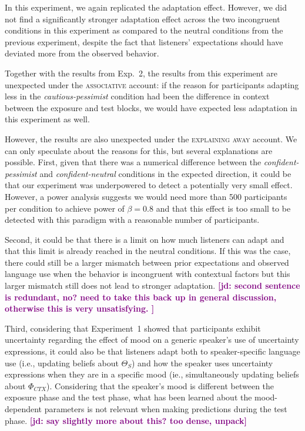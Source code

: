 \documentclass[man,floatsintext]{apa6}
\newcommand{\jd}[1]{\textcolor{Purple}{\bf [jd: #1]}}
\begin{document}
In this experiment, we again replicated the adaptation effect. However, we did not find a significantly stronger adaptation effect across the two incongruent conditions in this experiment as compared to the neutral conditions from the previous experiment, despite the fact that listeners' expectations should have deviated more from the observed behavior.

Together with the results from Exp.~2, the results from this experiment are unexpected under the \textsc{associative} account: if the reason for participants adapting less in the \textit{cautious-pessimist} condition had been the difference in context between the exposure and test blocks, we would have expected less adaptation in this experiment as well.

However, the results are also unexpected under the \textsc{explaining away} account. We can only speculate about the reasons for this, but several explanations are possible. First, given that there was a numerical difference between the \textit{confident-pessimist} and \textit{confident-neutral} conditions in the expected direction, it could be that our experiment was underpowered to detect a potentially very small effect. However, a power analysis suggests we would need more than 500 participants per condition to achieve power of $\beta=0.8$ and that this effect is too small to be detected with this paradigm with a reasonable number of participants.

Second, it could be that there is a limit on how much listeners can adapt and that this limit is already reached in the neutral conditions. If this was the case, there could still be a larger mismatch between prior expectations and observed language use when the behavior is incongruent with contextual factors but this larger mismatch still does not lead to stronger adaptation. \jd{second sentence is redundant, no? need to take this back up in general discussion, otherwise this is very unsatisfying. }

Third, considering that Experiment~1 showed that participants exhibit uncertainty regarding the effect of mood on a generic speaker's use of uncertainty expressions, it could also be that listeners  adapt both to speaker-specific language use (i.e., updating beliefs about $\Theta_S$) and how the speaker uses uncertainty expressions when they are in a specific mood (ie., simultaneously updating beliefs about $\Phi_{CTX}$). Considering that the speaker's mood is different between the exposure phase and the test phase, what has been learned about the mood-dependent parameters is not relevant when making predictions during the test phase.   \jd{say slightly more about this? too dense, unpack} 
\end{document}
